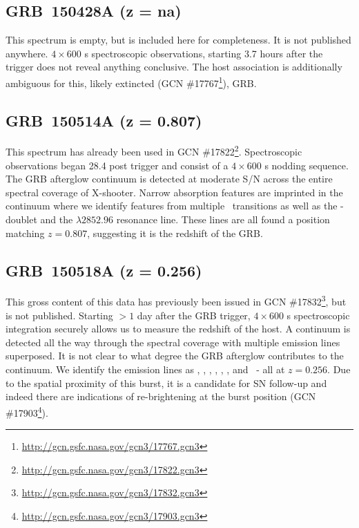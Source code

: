 \documentclass{aa}    %
\begin{document}
\subsection{GRB~150428A (z = na)}	

This spectrum is empty, but is included here for completeness. It is not
published anywhere. $4\times600$ s spectroscopic observations, starting 3.7
hours after the trigger does not reveal anything conclusive. The host
association is additionally ambiguous for this, likely extincted (GCN
\#17767\footnote{\url{http://gcn.gsfc.nasa.gov/gcn3/17767.gcn3}}), GRB.

\subsection{GRB~150514A (z = 0.807)}	

This spectrum has already been used in GCN
\#17822\footnote{\url{http://gcn.gsfc.nasa.gov/gcn3/17822.gcn3}}. Spectroscopic
observations began 28.4 post trigger and consist of a $4 \times 600$ s nodding
sequence. The GRB afterglow continuum is detected at moderate S/N across the
entire spectral coverage of X-shooter. Narrow absorption features are imprinted
in the continuum where we identify features from multiple \feii~transitions as
well as the \mgii-doublet and the \mgi$\lambda2852.96$ resonance line. These
lines are all found a position matching $z = 0.807$, suggesting it is the
redshift of the GRB.

\subsection{GRB~150518A (z = 0.256)}	

This gross content of this data has previously been issued in GCN
\#17832\footnote{\url{http://gcn.gsfc.nasa.gov/gcn3/17832.gcn3}}, but is not
published. Starting $> 1$ day after the GRB trigger, $4 \times 600$ s
spectroscopic integration securely allows us to measure the redshift of the
host. A continuum is detected all the way through the spectral coverage with
multiple emission lines superposed. It is not clear to what degree the GRB
afterglow contributes to the continuum. We identify the emission lines as \oii,
\hb, \oiii, \ha, \nii, \ha, and \sii~- all at $z = 0.256$. Due to the spatial
proximity of this burst, it is a candidate for SN follow-up and indeed there are
indications of re-brightening at the burst position (GCN
\#17903\footnote{\url{http://gcn.gsfc.nasa.gov/gcn3/17903.gcn3}}).
\end{document}
